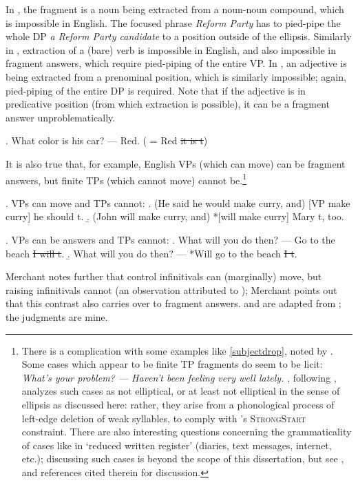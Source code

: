 \documentclass[doublespace]{umthesis}
\newcommand{\el}[1]{\sout{#1}}
\begin{document}
				
In \Last[a], the fragment is a noun being extracted from a noun-noun compound, which is impossible in English. The focused phrase {\it Reform Party} has to pied-pipe the whole DP {\it a Reform Party candidate} to a position outside of the ellipsis. Similarly in \Last[b], extraction of a (bare) verb is impossible in English, and also impossible in fragment answers, which require pied-piping of the entire VP. In \Last[c], an adjective is being extracted from a prenominal position, which is similarly impossible; again, pied-piping of the entire DP is required. Note that if the adjective is in predicative position (from which extraction is possible), it can be a fragment answer unproblematically. 

\ex. 		What color is his car? --- Red. ( = Red \el{it is t})

It is also true that, for example, English VPs (which can move) can be fragment answers, but finite TPs (which cannot move) cannot be.\footnote{There is a complication with some examples like \ref{subjectdrop}, noted by \cite{Me04}. Some cases which appear to be finite TP fragments do seem to be licit: {\it What's your problem? --- Haven't been feeling very well lately.} \cite{We12}, following \cite{Na82}, analyzes such cases as not elliptical, or at least not elliptical in the sense of ellipsis as discussed here: rather, they arise from a phonological process of left-edge deletion of weak syllables, to comply with \cite{Se09}'s \textsc{StrongStart} constraint. There are also interesting questions concerning the grammaticality of cases like \TextNext[b] in `reduced written register' (diaries, text messages, internet, etc.); discussing such cases is beyond the scope of this dissertation, but see \cite{Hae97, Ha07, HI01, We12}, and references cited therein for discussion.}

\ex. 		VPs can move and TPs cannot:
		\a. (He said he would make curry, and) [VP make curry] he should t.
		\b. (John will make curry, and) *[will make curry] Mary t, too.
		
\ex. 		VPs can be answers and TPs cannot:
		\a. What will you do then?		--- Go to the beach \el{I will t}.
		\b. What will you do then?		--- *Will go to the beach \el{I t}.\label{subjectdrop}

Merchant notes further that control infinitivals can (marginally) move, but raising infinitivals cannot (an observation attributed to \cite[62]{Cho81}); Merchant points out that this contrast also carries over to fragment answers. \Next and \NNext are adapted from \cite[696ff.]{Me04}; the judgments are mine.
\end{document}
